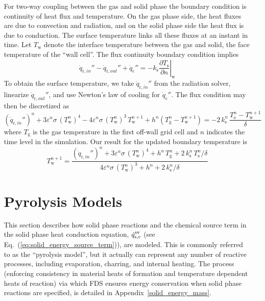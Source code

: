 For two-way coupling between the gas and solid phase the boundary condition is continuity of heat flux and temperature.  On the gas phase side, the heat fluxes are due to convection and radiation, and on the solid phase side the heat flux is due to conduction.  The surface temperature links all these fluxes at an instant in time.  Let $T_{\mathrm{w}}$ denote the interface temperature between the gas and solid, the face temperature of the ``wall cell''.  The flux continuity boundary condition implies
\begin{equation}
\label{eq:fluxcontinuity}
\dot{q}_{{\mathrm{r}}, in}'' - \dot{q}_{{\mathrm{r}}, out}'' + \dot{q}_{\mathrm{c}}'' = -k_{\mathrm{s}} \left. \frac{\partial T_{\mathrm{s}}}{\partial n} \right|_{\mathrm{w}}
\end{equation}
To obtain the surface temperature, we take $\dot{q}_{{\mathrm{r}}, in}''$ from the radiation solver, linearize $\dot{q}_{{\mathrm{r}}, out}''$, and use Newton's law of cooling for $\dot{q}_{\mathrm{c}}''$. The flux condition may then be discretized as
\begin{equation}
\label{eq:discflux}
( \dot{q}_{{\mathrm{r}}, in}'' )^n + 3 \varepsilon^n \sigma \, (T_{\mathrm{w}}^n)^4 - 4 \varepsilon^n \sigma \, (T_{\mathrm{w}}^n)^3 \, T_{\mathrm{w}}^{n+1} + h^n (T_{\mathrm{g}}^n - T_{\mathrm{w}}^{n+1}) = -2 \, k_{\mathrm{s}}^n \, \frac{T_{\mathrm{s}}^n - T_{\mathrm{w}}^{n+1}}{\delta}
\end{equation}
where $T_{\mathrm{g}}$ is the gas temperature in the first off-wall grid cell and $n$ indicates the time level in the simulation.  Our result for the updated boundary temperature is
\begin{equation}
\label{eq:tmpwall}
T_{\mathrm{w}}^{n+1} = \frac{ ( \dot{q}_{{\mathrm{r}}, in}'' )^n + 3 \varepsilon^n \sigma \, (T_{\mathrm{w}}^n)^4 + h^n \, T_{\mathrm{g}}^n + 2 \, k_{\mathrm{s}}^n \, T_{\mathrm{s}}^n/\delta }{ 4 \varepsilon^n \sigma \, (T_{\mathrm{w}}^n)^3 + h^n + 2 \, k_{\mathrm{s}}^n / \delta}
\end{equation}



\newpage
\section{Pyrolysis Models}
\label{pyrosection}

This section describes how solid phase reactions and the chemical source term in the solid phase heat conduction equation, $\dot{q}_{\rm s,c}'''$ (see Eq.~(\ref{eq:solid_energy_source_term})),  are modeled. This is commonly referred to as the ``pyrolysis model'', but it actually can represent any number of reactive processes, including evaporation, charring, and internal heating. The process (enforcing consistency in material heats of formation and temperature dependent heats of reaction) via which FDS ensures energy conservation when solid phase reactions are specified, is detailed in Appendix~\ref{solid_energy_mass}.


